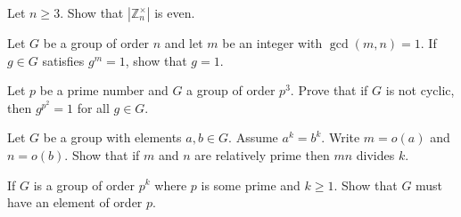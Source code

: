
\newcommand{\Z}{\mathbb{Z}}
\newcommand{\abar}{\overline{a}}


Let $n\geq 3$. Show that $|\Z_n^\times|$ is even.
	

Let $G$ be a group of order $n$ and let $m$ be an integer with $\gcd(m,n)=1$.  If $g\in G$ satisfies $g^m=1$, show that $g=1$.


Let $p$ be a prime number and $G$ a group of order $p^3$.  Prove that if $G$ is not cyclic, then $g^{p^2}=1$ for all $g\in G$.
	

Let $G$ be a group with elements $a,b\in G$.  Assume $a^k=b^k$.  Write $m=o(a)$ and $n=o(b)$.  Show that if $m$ and $n$ are relatively prime then $mn$ divides $k$.


If $G$ is a group of order $p^k$ where $p$ is some prime and $k\geq 1$.  Show that $G$ must have an element of order $p$.
